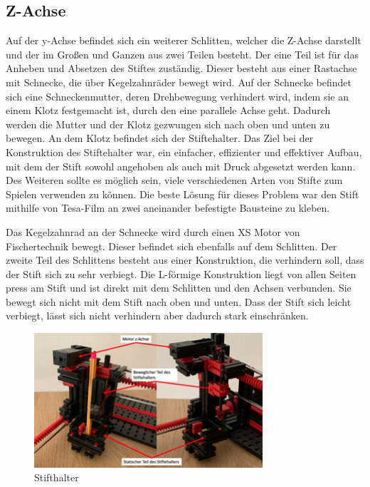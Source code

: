 \documentclass[conference,compsoc,final,a4paper]{IEEEtran}
\begin{document}
\subsection{Z-Achse}

Auf der y-Achse befindet sich ein weiterer Schlitten, welcher die Z-Achse darstellt und der im Großen und Ganzen aus zwei Teilen besteht. 
Der eine Teil ist für das Anheben und Absetzen des Stiftes zuständig. Dieser besteht aus einer Rastachse mit Schnecke, die über
Kegelzahnräder bewegt wird. Auf der Schnecke befindet sich eine Schneckenmutter, deren Drehbewegung verhindert wird, indem sie an einem
Klotz festgemacht ist, durch den eine parallele Achse geht. Dadurch werden die Mutter und der Klotz gezwungen sich nach oben und unten zu
bewegen. An dem Klotz befindet sich der Stiftehalter. Das Ziel bei der Konstruktion des Stiftehalter war, ein einfacher, effizienter und
effektiver Aufbau, mit dem der Stift sowohl angehoben als auch mit Druck abgesetzt werden kann. Des Weiteren sollte es möglich sein, viele
verschiedenen Arten von Stifte zum Spielen verwenden zu können. Die beste Lösung für dieses Problem war den Stift mithilfe von Tesa-Film
an zwei aneinander befestigte Bausteine zu kleben. 

Das Kegelzahnrad an der Schnecke wird durch einen XS Motor von Fischertechnik bewegt. Dieser befindet sich ebenfalls auf dem Schlitten.
Der zweite Teil des Schlittens besteht aus einer Konstruktion, die verhindern soll, dass der Stift sich zu sehr verbiegt. Die L-förmige
Konstruktion liegt von allen Seiten press am Stift und ist direkt mit dem Schlitten und den Achsen verbunden. Sie bewegt sich nicht mit
dem Stift nach oben und unten. Dass der Stift sich leicht verbiegt, lässt sich nicht verhindern aber dadurch stark einschränken.

\begin{figure}[h]
\centering
\includegraphics[width=8.5cm]{../images/zAchse.png}
\caption{Stifthalter}
\label{Mechanik:Aufbau}
\end{figure}
\end{document}
